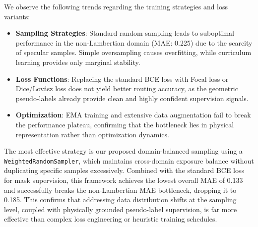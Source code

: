 \begin{table}[!t]
\centering
\caption{Ablation Study on Training Strategies and Loss Functions. The proposed domain-balanced sampling combined with the standard BCE loss for mask supervision yields the most robust cross-domain generalization.}
\label{tab:training_ablation}
\end{table}

We observe the following trends regarding the training strategies and loss variants:
\begin{itemize}
    \item \textbf{Sampling Strategies}: Standard random sampling leads to suboptimal performance in the non-Lambertian domain (MAE: 0.225) due to the scarcity of specular samples. Simple oversampling causes overfitting, while curriculum learning provides only marginal stability.
    \item \textbf{Loss Functions}: Replacing the standard BCE loss with Focal loss or Dice/Lov\'{a}sz loss does not yield better routing accuracy, as the geometric pseudo-labels already provide clean and highly confident supervision signals.
    \item \textbf{Optimization}: EMA training and extensive data augmentation fail to break the performance plateau, confirming that the bottleneck lies in physical representation rather than optimization dynamics.
\end{itemize}

The most effective strategy is our proposed domain-balanced sampling using a \texttt{WeightedRandomSampler}, which maintains cross-domain exposure balance without duplicating specific samples excessively. Combined with the standard BCE loss for mask supervision, this framework achieves the lowest overall MAE of 0.133 and successfully breaks the non-Lambertian MAE bottleneck, dropping it to 0.185. This confirms that addressing data distribution shifts at the sampling level, coupled with physically grounded pseudo-label supervision, is far more effective than complex loss engineering or heuristic training schedules.